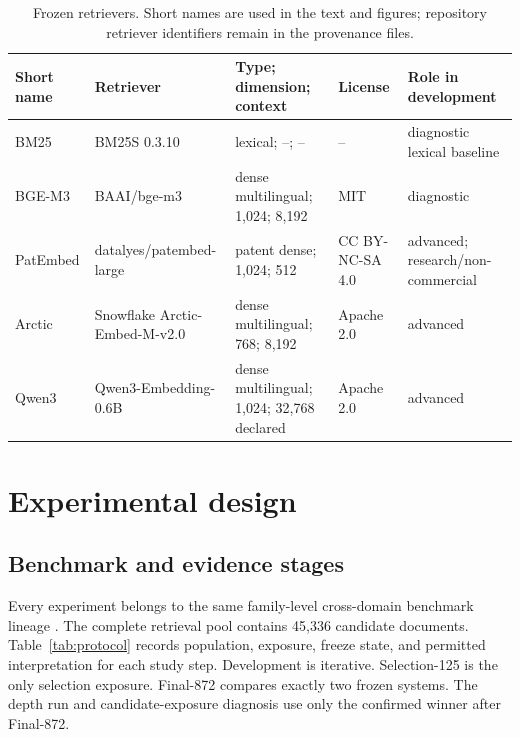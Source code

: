 \documentclass[final,5p,times,twocolumn]{elsarticle}
\newenvironment{widejournal}{\begin{table}[!t]}{\end{table}}
\newcommand{\journalTableFont}{\footnotesize}
\newenvironment{widejournal}{\begin{table}[!htbp]}{\end{table}}
\newcommand{\journalTableFont}{\footnotesize}
\begin{document}
\begin{widejournal}
\caption{Frozen retrievers. Short names are used in the text and figures;
repository retriever identifiers remain in the provenance files.}
\label{tab:retrievers}
\centering
\journalTableFont
\renewcommand{\arraystretch}{0.96}
\begin{tabularx}{\textwidth}{@{}P{1.65cm}P{2.75cm}P{2.9cm}P{2.0cm}Y@{}}
\toprule
Short name & Retriever & Type; dimension; context & License & Role in development \\
\midrule
BM25 & BM25S 0.3.10 & lexical; --; -- & -- & diagnostic lexical baseline
\cite{bm25review2009} \\
BGE-M3 & BAAI/bge-m3 & dense multilingual; 1,024; 8,192 & MIT & diagnostic
\cite{bgem3} \\
PatEmbed & datalyes/\allowbreak patembed-large & patent dense; 1,024; 512 &
CC BY-NC-SA 4.0 & advanced; research/non-commercial \\
Arctic & Snowflake Arctic-Embed-M-v2.0 & dense multilingual; 768; 8,192 &
Apache 2.0 & advanced \cite{arcticembed} \\
Qwen3 & Qwen3-Embedding-0.6B & dense multilingual; 1,024; 32,768 declared &
Apache 2.0 & advanced \cite{qwen3embedding} \\
\bottomrule
\end{tabularx}
\end{widejournal}

\section{Experimental design}

\subsection{Benchmark and evidence stages}

Every experiment belongs to the same family-level cross-domain benchmark
lineage \cite{dapfam2026}. The complete retrieval pool contains 45,336
candidate documents. Table~\ref{tab:protocol} records population, exposure,
freeze state, and permitted interpretation for each study step. Development
is iterative. Selection-125 is the only selection exposure. Final-872 compares
exactly two frozen systems. The depth run and candidate-exposure diagnosis use
only the confirmed winner after Final-872.
\end{document}

